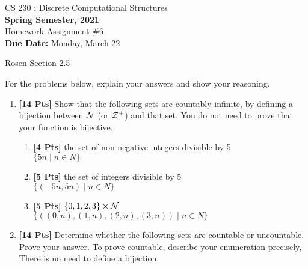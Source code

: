 \documentclass[11pt]{article}
\begin{document}
    \begin{center}
    {{\large CS 230 : Discrete Computational Structures}}
        \\


        {\bf Spring Semester, 2021}\\

        {\sc Homework Assignment \#6}\\
        {\bf Due Date:}  Monday, March 22
    \end{center}

     Rosen Section 2.5

    For the problems below, explain your answers and show your reasoning.

    \begin{enumerate}

        \item {\bf [14 Pts]} Show that the following sets are countably
        infinite, by defining a bijection between $\cal N$ (or $\cal Z^+$) and that
        set. You do not need to prove that your function is bijective.

        \begin{enumerate}

            \item {\bf [4 Pts]} the set of non-negative integers divisible by 5 \\
            $\{ 5n\; |\; n \in N \}$

            \item {\bf [5 Pts]} the set of integers divisible by 5 \\
            $\{ (-5n, 5n)\; |\; n \in N \}$

            \item {\bf [5 Pts]} $\{0,1,2,3\} \times {\cal N}$ \\
            $\{ ((0, n),(1, n),(2, n),(3, n))\; |\; n \in N \}$

        \end{enumerate}

        \item {\bf [14 Pts]} Determine whether the following sets are countable or
        uncountable. Prove your answer. To prove countable, describe your enumeration precisely, There is no need to define a bijection.

        \begin{enumerate}


\end{enumerate}
\end{enumerate}
\end{document}
